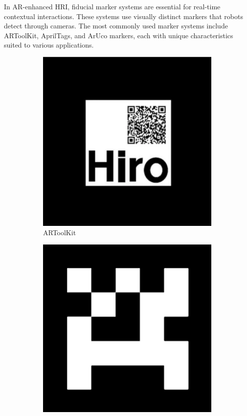 In AR-enhanced HRI, fiducial marker systems are essential for real-time contextual interactions. These systems use visually distinct markers that robots detect through cameras. The most commonly used marker systems include ARToolKit, AprilTags, and ArUco markers, each with unique characteristics suited to various applications.
\begin{figure}[ht]
    \centering
    \begin{subfigure}[b]{0.25\textwidth}
        \centering
        \includegraphics[width=\textwidth]{ch1/figs/ARToolkit.jpg}
        \caption{ARToolKit}
        \label{fig:artoolkit}
    \end{subfigure}
    \hfill
    \begin{subfigure}[b]{0.25\textwidth}
        \centering
        \includegraphics[width=\textwidth]{ch1/figs/AprilTag.png}

\end{subfigure}
\end{figure}
